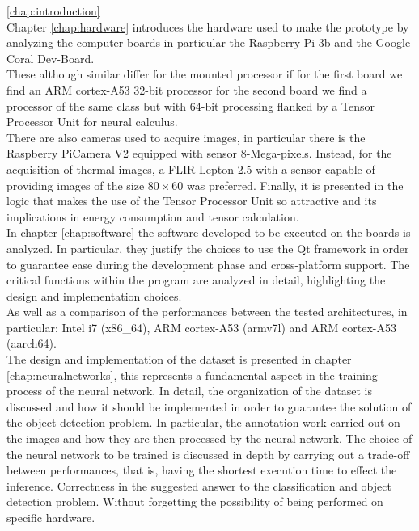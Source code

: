 \ref{chap:introduction}\\


\noindent Chapter \ref{chap:hardware} introduces the hardware used to make the
prototype by analyzing the computer boards in particular the Raspberry Pi 3b and
the Google Coral Dev-Board.\\
These although similar differ for the mounted processor if for the first board
we find an ARM cortex-A53 32-bit processor for the second board we find a
processor of the same class but with 64-bit processing flanked by a Tensor
Processor Unit for neural calculus.\\
There are also cameras used to acquire images, in particular there is the
Raspberry PiCamera V2 equipped with sensor 8-Mega-pixels. 
Instead, for the acquisition of thermal images, a FLIR Lepton 2.5 with a sensor
capable of providing images of the size $ 80 \times 60 $ was preferred. 
Finally, it is presented in the logic that makes the use of the Tensor Processor
Unit so attractive and its implications in energy consumption and tensor
calculation.\\

\noindent In chapter \ref{chap:software} the software developed to be executed
on the boards is analyzed. 
In particular, they justify the choices to use the Qt framework in
order to guarantee ease during the development phase and cross-platform support.
The critical functions within the program are analyzed in detail, highlighting
the design and implementation choices.\\ 
As well as a comparison of the performances between the tested architectures, in
particular: Intel i7 (x86\_64), ARM cortex-A53 (armv7l) and ARM cortex-A53
(aarch64).\\


\noindent The design and implementation of the dataset is presented in chapter
\ref{chap:neuralnetworks}, this represents a fundamental aspect in the training
process of the neural network.
In detail, the organization of the dataset is discussed and how it should be
implemented in order to guarantee the solution of the object detection problem.
In particular, the annotation work carried out on the images and how they are
then processed by the neural network.
The choice of the neural network to be trained is discussed in depth by carrying
out a trade-off between performances, that is, having the shortest execution
time to effect the inference. 
Correctness in the suggested answer to the classification and object detection
problem. 
Without forgetting the possibility of being performed on specific hardware.\\


